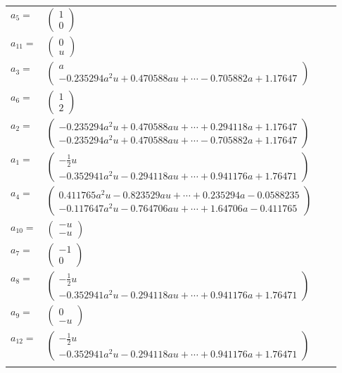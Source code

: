 \documentclass[1p]{elsarticle_modified}
\theoremstyle{definition}
\begin{document}
\begin{tabular}{m{7pt} m{180pt} m{7pt} m{180pt} }
\flushright $a_{5}=$&$\begin{pmatrix}1\\0\end{pmatrix}$ \\
\flushright $a_{11}=$&$\begin{pmatrix}0\\u\end{pmatrix}$ \\
\flushright $a_{3}=$&$\begin{pmatrix}a\\-0.235294 a^{2} u+0.470588 a u+\cdots-0.705882 a+1.17647\end{pmatrix}$ \\
\flushright $a_{6}=$&$\begin{pmatrix}1\\2\end{pmatrix}$ \\
\flushright $a_{2}=$&$\begin{pmatrix}-0.235294 a^{2} u+0.470588 a u+\cdots+0.294118 a+1.17647\\-0.235294 a^{2} u+0.470588 a u+\cdots-0.705882 a+1.17647\end{pmatrix}$ \\
\flushright $a_{1}=$&$\begin{pmatrix}-\frac{1}{2} u\\-0.352941 a^{2} u-0.294118 a u+\cdots+0.941176 a+1.76471\end{pmatrix}$ \\
\flushright $a_{4}=$&$\begin{pmatrix}0.411765 a^{2} u-0.823529 a u+\cdots+0.235294 a-0.0588235\\-0.117647 a^{2} u-0.764706 a u+\cdots+1.64706 a-0.411765\end{pmatrix}$ \\
\flushright $a_{10}=$&$\begin{pmatrix}- u\\- u\end{pmatrix}$ \\
\flushright $a_{7}=$&$\begin{pmatrix}-1\\0\end{pmatrix}$ \\
\flushright $a_{8}=$&$\begin{pmatrix}-\frac{1}{2} u\\-0.352941 a^{2} u-0.294118 a u+\cdots+0.941176 a+1.76471\end{pmatrix}$ \\
\flushright $a_{9}=$&$\begin{pmatrix}0\\- u\end{pmatrix}$ \\
\flushright $a_{12}=$&$\begin{pmatrix}-\frac{1}{2} u\\-0.352941 a^{2} u-0.294118 a u+\cdots+0.941176 a+1.76471\end{pmatrix}$\\&\end{tabular}
\end{document}
